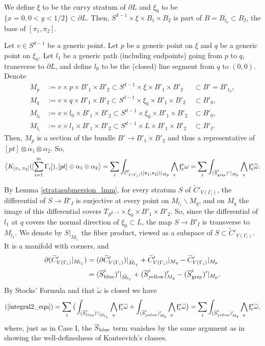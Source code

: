 \documentclass[11pt]{article}
\theoremstyle{definition}
\theoremstyle{remark}
\def\wt#1{\widetilde{#1}}
\def\ov#1{\overline{#1}}
\def\mr#1{{\mathring{#1}}}
\def\sgray{{\textnormal{gray}}}
\def\syellow{{\textnormal{yellow}}}
\def\sblue{{\textnormal{blue}}}
\def\ff{\mathfrak{f}}
\begin{document}
We define $\xi$ to be the curvy stratum of $\partial L$ and $\xi_0$ to be $\{x=0,0<y<1/2\}\subset\partial L$. 
Then, $S^{d-1}\times\xi\times B_1\times B_2$ is part of $B=B_{t_0}\subset B_I$, the base of $[\pi_1,\pi_2]$. 

Let $v\in S^{d-1}$ be a generic point. 
Let $p$ be a generic point on $\xi$ and $q$ be a generic point on $\xi_0$. Let $l_1$ be a generic path (including endpoints) going from $p$ to $q$, transverse to $\partial L$, and define $l_0$ to be the (closed) line segment from $q$ to $(0,0)$. 
Denote 
\begin{align*}
M_{p}&:=v\times p\times B'_1\times B'_2\subset S^{d-1}\times \xi\times B'_1\times B'_2&\subset B'=B'_{t_0},\\
M_{q}&:=v\times q\times B'_1\times B'_2\subset S^{d-1}\times \xi_0\times B'_1\times B'_2&\subset B'_0,\\
M_{l_0}&:=v\times l_0\times B'_1\times B'_2\subset S^{d-1}\times \xi_0\times B'_1\times B'_2&\subset B'_0,\\
M_{l_1}&:=v\times l_1\times B'_1\times B'_2\subset S^{d-1}\times L\times B'_1\times B'_2&\subset B'_I. 
\end{align*}
Then, $M_p$ is a section of the bundle $B'\to B'_1\times B'_2$ and thus a representative of $[pt]\otimes\alpha_1\otimes\alpha_2$. 
So,  
\begin{equation}
\label{integral2_eqn}
\big\langle K_{[\pi_1,\pi_2]}([\sum_{i=1}^m\Gamma_i]), [pt]\otimes\alpha_1\otimes\alpha_2 \big\rangle=
\sum_{i}\int_{\ov{C}'_{V(\Gamma_i)}([\pi_1,\pi_2])|_{M_p}}\bigwedge_{e}\ff_e^*{\omega}=
\sum_{i}\int_{(\ov{S}_{\sgray}^i)'|_{M_p}}\bigwedge_{e}\ff_e^*\wt{\omega}.
\end{equation}

By Lemma \ref{stratasubmersion_lmm}, for every stratum $S$ of $\wt{C}'_{V(\Gamma_i)}$, the differential of  $S\to B'_I$ is surjective at every point on $M_{l_1}\backslash M_q$, and on $M_q$ the image of this differential covers $T_{S^{d-1}}\times\xi_0\times B'_1\times B'_2$. So, since the differential of $l_1$ at $q$ covers the normal direction of $\xi_0\subset L$, the map $S\to B'_I$ is transverse to $M_{l_1}$. 
We denote by $S|_{M_{l_1}}$ the fiber product, viewed as a subspace of $S\subset \wt{C}'_{V(\Gamma_i)}$. 
It is a manifold with corners, and 
\begin{align*}
\partial(\wt{C}'_{V(\Gamma_i)}|_{M_{l_1}})&=
(\partial\wt{C}'_{V(\Gamma_i)})|_{\mr{M}_{l_1}}+ \wt{C}'_{V(\Gamma_i)}|_{M_{q}}-\wt{C}'_{V(\Gamma_i)}|_{M_{p}}\\
&=(\ov{S}_{\sblue}^i)'|_{\mr{M}_{l_1}}+(\ov{S}_{\syellow}^i)'_{M_q}-(\ov{S}_{\sgray}^i)'|_{M_p}.
\end{align*}
By Stocks' Formula and that $\wt\omega$ is closed we have
\begin{equation}\label{stocks3_eqn}
(\ref{integral2_eqn})=\sum_i\big(\int_{(\ov{S}_{\sblue}^i)'|_{\mr{M}_{l_1}}}\bigwedge_e\ff_e^*\wt\omega+\int_{(\ov{S}_{\syellow}^i)'_{M_q}}\bigwedge_e\ff_e^*\wt\omega\big)=\sum_i\int_{(\ov{S}_{\syellow}^i)'_{M_q}}\bigwedge_e\ff_e^*\wt\omega,
\end{equation}
where, just as in Case I, the $\ov{S}_{\sblue}$ term vanishes by the same argument as in showing the well-definedness of Kontsevich's classes.  
\end{document}
